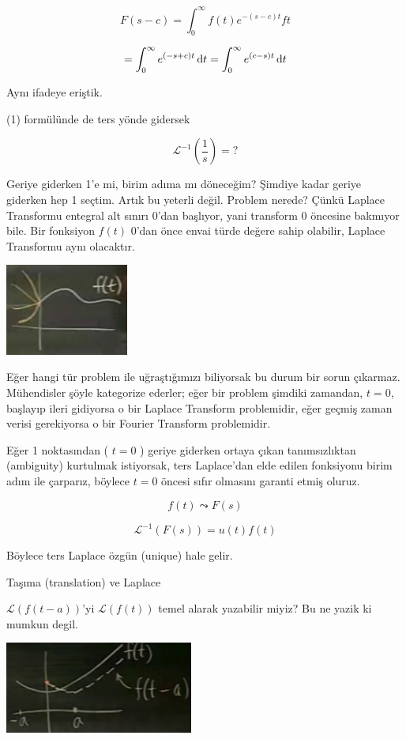 \documentclass[12pt,fleqn]{article}\usepackage{../../common}
\begin{document}
$$ F(s-c) = \int_{0}^{\infty} f(t) e^{-(s-c)t} ft  $$

$$ = \int_{0}^{\infty} e^{(-s+c)t} \,\mathrm{d} t  = \int_{0}^{\infty} e^{(c-s)t} \,\mathrm{d} t $$

Aynı ifadeye eriştik. 

(1) formülünde de ters yönde gidersek

$$ \mathcal{L}^{-1}(\frac{1}{s}) = ?  $$

Geriye giderken 1'e mi, birim adıma mı döneceğim? Şimdiye kadar geriye
giderken hep 1 seçtim. Artık bu yeterli değil. Problem nerede? Çünkü
Laplace Transformu entegral alt sınırı 0'dan başlıyor, yani transform 0
öncesine bakmıyor bile. Bir fonksiyon $f(t)$ 0'dan önce envai türde değere
sahip olabilir, Laplace Transformu aynı olacaktır. 

\includegraphics[height=3cm]{22_6.png}

Eğer hangi tür problem ile uğraştığımızı biliyorsak bu durum bir sorun
çıkarmaz. Mühendisler şöyle kategorize ederler; eğer bir problem şimdiki
zamandan, $t=0$, başlayıp ileri gidiyorsa o bir Laplace Transform
problemidir, eğer geçmiş zaman verisi gerekiyorsa o bir Fourier Transform
problemidir. 

Eğer 1 noktasından ( $t=0$ ) geriye giderken ortaya çıkan tanımsızlıktan
(ambiguity) kurtulmak istiyorsak, ters Laplace'dan elde edilen fonksiyonu
birim adım ile çarparız, böylece $t=0$ öncesi sıfır olmasını garanti etmiş
oluruz.

$$ f(t) \leadsto F(s) $$

$$ \mathcal{L}^{-1}(F(s)) = u(t)f(t) $$

Böylece ters Laplace özgün (unique) hale gelir.

Taşıma (translation) ve Laplace 

$\mathcal{L}(f(t-a))$'yi $\mathcal{L}(f(t))$ temel alarak yazabilir miyiz?
Bu ne yazik ki mumkun degil. 

\includegraphics[height=3cm]{22_7.png}
\end{document}
